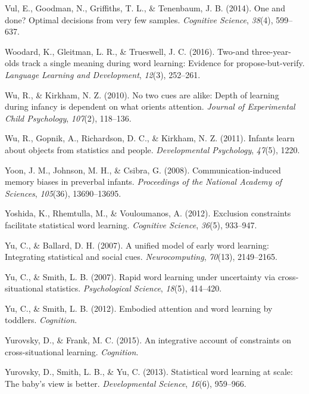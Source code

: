 \documentclass[authoryear, review]{elsarticle}
\begin{document}
\hypertarget{ref-vul2014}{}
Vul, E., Goodman, N., Griffiths, T. L., \& Tenenbaum, J. B. (2014). One
and done? Optimal decisions from very few samples. \emph{Cognitive
Science}, \emph{38}(4), 599--637.

\hypertarget{ref-woodard2016two}{}
Woodard, K., Gleitman, L. R., \& Trueswell, J. C. (2016). Two-and
three-year-olds track a single meaning during word learning: Evidence
for propose-but-verify. \emph{Language Learning and Development},
\emph{12}(3), 252--261.

\hypertarget{ref-wu2010no}{}
Wu, R., \& Kirkham, N. Z. (2010). No two cues are alike: Depth of
learning during infancy is dependent on what orients attention.
\emph{Journal of Experimental Child Psychology}, \emph{107}(2),
118--136.

\hypertarget{ref-wu2011infants}{}
Wu, R., Gopnik, A., Richardson, D. C., \& Kirkham, N. Z. (2011). Infants
learn about objects from statistics and people. \emph{Developmental
Psychology}, \emph{47}(5), 1220.

\hypertarget{ref-yoon2008communication}{}
Yoon, J. M., Johnson, M. H., \& Csibra, G. (2008). Communication-induced
memory biases in preverbal infants. \emph{Proceedings of the National
Academy of Sciences}, \emph{105}(36), 13690--13695.

\hypertarget{ref-yoshida2012exclusion}{}
Yoshida, K., Rhemtulla, M., \& Vouloumanos, A. (2012). Exclusion
constraints facilitate statistical word learning. \emph{Cognitive
Science}, \emph{36}(5), 933--947.

\hypertarget{ref-yu2007unified}{}
Yu, C., \& Ballard, D. H. (2007). A unified model of early word
learning: Integrating statistical and social cues.
\emph{Neurocomputing}, \emph{70}(13), 2149--2165.

\hypertarget{ref-yu2007rapid}{}
Yu, C., \& Smith, L. B. (2007). Rapid word learning under uncertainty
via cross-situational statistics. \emph{Psychological Science},
\emph{18}(5), 414--420.

\hypertarget{ref-yu2012embodied}{}
Yu, C., \& Smith, L. B. (2012). Embodied attention and word learning by
toddlers. \emph{Cognition}.

\hypertarget{ref-yurovsky2014algorithmic}{}
Yurovsky, D., \& Frank, M. C. (2015). An integrative account of
constraints on cross-situational learning. \emph{Cognition}.

\hypertarget{ref-yurovsky2013statistical}{}
Yurovsky, D., Smith, L. B., \& Yu, C. (2013). Statistical word learning
at scale: The baby's view is better. \emph{Developmental Science},
\emph{16}(6), 959--966.


\end{document}
